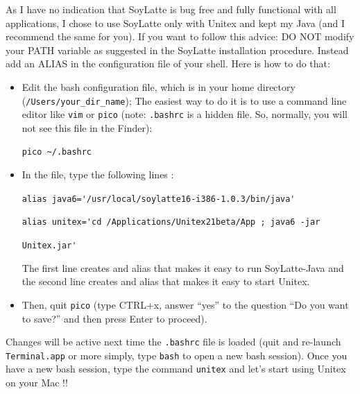 \bigskip
\noindent As I have no indication that SoyLatte is bug free and fully
functional with all applications, I chose to use SoyLatte only with 
Unitex and kept my Java (and I recommend the same for you). If you 
want to follow this advice: DO NOT modify your PATH variable as suggested 
in the SoyLatte installation procedure. Instead add an ALIAS in the configuration 
file of your shell. Here is how to do that:
\begin{itemize}
    \item Edit the bash configuration file, which is in your home directory 
    (\verb+/Users/your_dir_name+); The easiest way to do it is to use a command
    line editor like \verb+vim+ or \verb+pico+ (note: \verb+.bashrc+ is a hidden
    file. So, normally, you will not see this file in the Finder):
    
    \bigskip
    \verb+pico ~/.bashrc+
    
    \item In the file, type the following lines :
    
    \bigskip
    \verb+alias java6='/usr/local/soylatte16-i386-1.0.3/bin/java'+
    
    \verb+alias unitex='cd /Applications/Unitex21beta/App ; java6 -jar+
    
    \verb+Unitex.jar'+
    
    \bigskip
    \noindent The first line creates and alias that makes it easy to run
    SoyLatte-Java and the second line creates and alias that makes it easy to start Unitex.
    
    \item Then, quit \verb+pico+ (type CTRL+x, answer ``yes'' to the question
    ``Do you want to save?'' and then press Enter to proceed).
\end{itemize}

\noindent Changes will be active next time the \verb+.bashrc+ file is loaded
(quit and re-launch \verb+Terminal.app+ or more simply, type \verb+bash+ to open
a new bash session). Once you have a new bash session, type the command 
\verb+unitex+ and let's start using Unitex on your Mac !!

